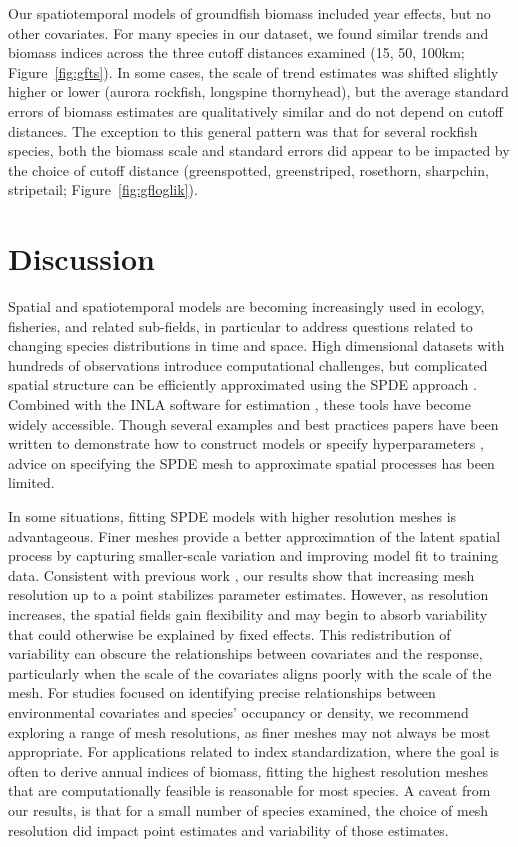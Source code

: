 \documentclass[11pt]{article}
\begin{document}
Our spatiotemporal models of groundfish biomass included year effects, but no
other covariates. For many species in our dataset, we found similar trends and
biomass indices across the three cutoff distances examined (15, 50, 100km;
Figure~\ref{fig:gfts}). In some cases, the scale of trend estimates was shifted
slightly higher or lower (aurora rockfish, longspine thornyhead), but the
average standard errors of biomass estimates are qualitatively similar and do
not depend on cutoff distances. The exception to this general pattern was that
for several rockfish species, both the biomass scale and standard errors did
appear to be impacted by the choice of cutoff distance (greenspotted,
greenstriped, rosethorn, sharpchin, stripetail; Figure~\ref{fig:gfloglik}).

\section{Discussion}\label{discussion}

Spatial and spatiotemporal models are becoming increasingly used in ecology,
fisheries, and related sub-fields, in particular to address questions related
to changing species distributions in time and space. High dimensional datasets
with hundreds of observations introduce computational challenges, but
complicated spatial structure can be efficiently approximated using the SPDE
approach \citep{miller2020}. Combined with the INLA software for estimation
\citep{rue_approximate_2009}, these tools have become widely accessible. Though
several examples and best practices papers have been written to demonstrate how
to construct models or specify hyperparameters
\citep{lindgren_bayesian_2015,gomez-rubio_bayesian}, advice on specifying the
SPDE mesh to approximate spatial processes has been limited.

In some situations, fitting SPDE models with higher resolution meshes is
advantageous. Finer meshes provide a better approximation of the latent spatial
process by capturing smaller-scale variation and improving model fit to
training data. Consistent with previous work \citep{roste_2020}, our results
show that increasing mesh resolution up to a point stabilizes parameter
estimates. However, as resolution increases, the spatial fields gain
flexibility and may begin to absorb variability that could otherwise be
explained by fixed effects. This redistribution of variability can obscure the
relationships between covariates and the response, particularly when the scale
of the covariates aligns poorly with the scale of the mesh. For studies focused
on identifying precise relationships between environmental covariates and
species' occupancy or density, we recommend exploring a range of mesh
resolutions, as finer meshes may not always be most appropriate. For
applications related to index standardization, where the goal is often to
derive annual indices of biomass, fitting the highest resolution meshes that
are computationally feasible is reasonable for most species. A caveat from our
results, is that for a small number of species examined, the choice of mesh
resolution did impact point estimates and variability of those estimates.
\end{document}
